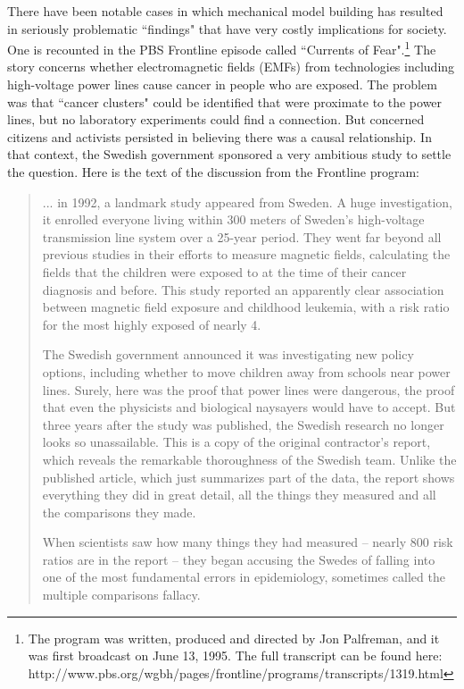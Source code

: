 \documentclass[11pt,openany]{book}\usepackage[]{graphicx}\usepackage[]{color}
\begin{document}
{There have been notable cases in which mechanical model building has resulted in seriously problematic ``findings" that have very costly implications for society. One is recounted in the PBS Frontline episode called ``Currents of Fear".\footnote{The program was written, produced  and directed by Jon Palfreman, and it was first broadcast on June 13, 1995. The full transcript can be found here: http://www.pbs.org/wgbh/pages/frontline/programs/transcripts/1319.html} The story concerns whether electromagnetic fields (EMFs) from technologies including high-voltage power lines cause cancer in people who are exposed. The problem was that ``cancer clusters" could be identified that were proximate to the power lines, but no laboratory experiments could find a connection. But concerned citizens and activists persisted in believing there was a causal relationship. In that context, the Swedish government sponsored a very ambitious study to settle the question. Here is the text of the discussion from  the Frontline program:

\begin{quote}
... in 1992, a landmark study appeared from Sweden. A huge investigation, it enrolled everyone  living within 300 meters of Sweden's high-voltage  transmission line system over a 25-year period.  They went far beyond all previous studies in their efforts to measure magnetic fields, calculating the fields that the children were exposed to at the time of their cancer diagnosis and before. This study  reported an apparently clear association between magnetic field exposure and childhood leukemia, with a risk ratio for the most highly exposed of nearly 4.

The Swedish government announced it was investigating new policy options, including whether to  move children away from schools near power lines. Surely, here was the proof that power lines were  dangerous, the proof that even the physicists and biological naysayers would have to accept. But three years after the study was published, the Swedish research no longer looks so unassailable. This is a  copy of the original contractor's report, which reveals the remarkable thoroughness of the Swedish team.  Unlike the published article, which just summarizes part of the data, the report shows everything they did in  great detail, all the things they measured and all the comparisons they made.

When scientists saw how many things they had measured -- nearly 800 risk ratios are in the report -- they began accusing the Swedes of falling into one of the most fundamental errors in epidemiology, sometimes called the multiple comparisons fallacy.
\end{quote}

}
\end{document}

